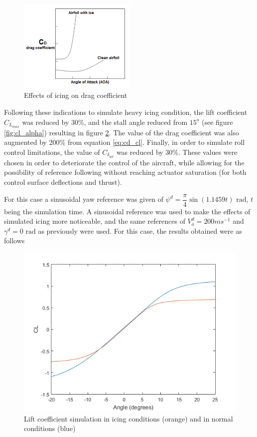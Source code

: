 \begin{figure}[H]
\centering
\includegraphics[width=0.5\textwidth]{Figures/Results/icing_drag.PNG}
\caption[Effects of icing on drag coefficient]{Effects of icing on drag coefficient \cite{icing_cond}}
\label{fig:icing_drag}
\end{figure}

Following these indications to simulate heavy icing condition, the lift coefficient $C_{L_{max}}$ was reduced by 30\%, and the stall angle reduced from $15^o$ (see figure \ref{fig:cl_alpha}) resulting in figure \ref{fig:cl_icing}. The value of the drag coefficient was also augmented by 200\% from equation \ref{eq:cd_cl}. Finally, in order to simulate roll control limitations, the value of $C_{\delta_{ail}}$ was reduced by 30\%. These values were chosen in order to deteriorate the control of the aircraft, while allowing for the possibility of reference following without reaching actuator saturation (for both control surface deflections and thrust). 

For this case a sinusoidal yaw reference was given of $\psi^d= \dfrac{\pi}{4} \sin (1.1459t)\text{ rad}$, $t$ being the simulation time. A sinusoidal reference was used to make the effects of simulated icing more noticeable, and the same references of $V_a^d=200ms^{-1}$ and $\gamma^d=0\text{ rad}$ as previously were used. For this case, the results obtained were as follows

\begin{figure}[H]
\centering
\includegraphics[width=1\textwidth]{Figures/Results/cl_icing.PNG}
\caption[Lift coefficient simulation in icing conditions]{Lift coefficient simulation in icing conditions (orange) and in normal conditions (blue)}
\label{fig:cl_icing}
\end{figure}

